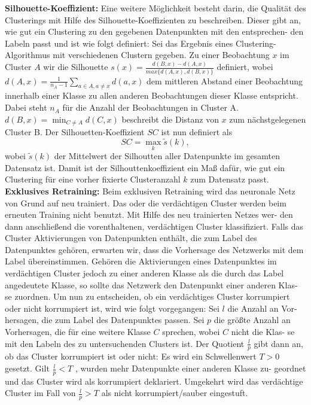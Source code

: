 \documentclass[11pt,a4paper]{article}
\numberwithin{equation}{section}
\begin{document}
		\noindent \textbf{Silhouette-Koeffizient:} Eine weitere Möglichkeit besteht darin, die Qualität
		des Clusterings mit Hilfe des Silhouette-Koeffizienten zu beschreiben. Dieser gibt
		an, wie gut ein Clustering zu den gegebenen Datenpunkten mit den entsprechen-
		den Labeln passt und ist wie folgt definiert: Sei das Ergebnis eines Clustering-
		Algorithmus mit verschiedenen Clustern gegeben. Zu einer Beobachtung $x$ im Cluster $A$ wir die Silhouette $s(x) = \frac{d(B,x)-d(A,x)}{max\lbrace d(A,x), d(B,x) \rbrace}$ definiert, wobei $d(A,x)  = \frac{1}{n_A -1}\sum_{a \in A, a \neq x}{d(a,x)}$ dem mittleren Abstand einer Beobachtung innerhalb einer Klasse zu allen anderen Beobachtungen dieser Klasse entspricht.
		Dabei steht $n_A$ für die Anzahl der Beobachtungen in Cluster A. $d(B,x) = \min_{C \neq A}d(C,x)$ beschreibt die Distanz von $x$ zum nächstgelegenen Cluster B. Der Silhouetten-Koeffizient $SC$ ist nun definiert als
		\begin{equation}
			SC = \max_k \tilde{s}(k),
		\end{equation}
		wobei $\tilde{s}(k)$ der Mittelwert der Silhoutten aller Datenpunkte im gesamten Datensatz ist. Damit ist der Silhouttenkoeffizient ein Maß dafür, wie gut ein Clustering für eine vorher fixierte Clusteranzahl $k$ zum Datensatz passt.\\
		
		\noindent \textbf{Exklusives Retraining:} Beim exklusiven Retraining wird das neuronale Netz
		von Grund auf neu trainiert. Das oder die verdächtigen Cluster werden beim
		erneuten Training nicht benutzt. Mit Hilfe des neu trainierten Netzes wer-
		den dann anschließend die vorenthaltenen, verdächtigen Cluster klassifiziert.
		Falls das Cluster Aktivierungen von Datenpunkten enthält, die zum Label des
		Datenpunktes gehören, erwarten wir, dass die Vorhersage des Netzwerks mit
		dem Label übereinstimmen. Gehören die Aktivierungen eines Datenpunktes im
		verdächtigen Cluster jedoch zu einer anderen Klasse als die durch das Label
		angedeutete Klasse, so sollte das Netzwerk den Datenpunkt einer anderen Klas-
		se zuordnen. Um nun zu entscheiden, ob ein verdächtiges Cluster korrumpiert
		oder nicht korrumpiert ist, wird wie folgt vorgegangen: Sei $l$ die Anzahl an Vor-
		hersagen, die zum Label des Datenpunktes passen. Sei $p$ die größte Anzahl an
		Vorhersagen, die für eine weitere Klasse $C$ sprechen, wobei $C$ nicht die Klas-
		se mit den Labeln des zu untersuchenden Clusters ist. Der Quotient $\frac{l}{p}$ gibt
		dann an, ob das Cluster korrumpiert ist oder nicht: Es wird ein Schwellenwert
		$T > 0$ gesetzt. Gilt $\frac{l}{p} < T$ , wurden mehr Datenpunkte einer anderen Klasse zu-
		geordnet und das Cluster wird als korrumpiert deklariert. Umgekehrt wird das
		verdächtige Cluster im Fall von $\frac{l}{p} > T$ als nicht korrumpiert/sauber eingestuft.
		
\end{document}
